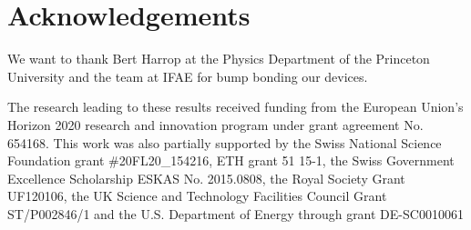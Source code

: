 \section*{Acknowledgements} 
We want to thank Bert Harrop at the Physics Department of the Princeton University and the team at IFAE for bump bonding our devices.\par
The research leading to these results received funding from the European Union's Horizon 2020 research and innovation program under grant agreement No. 654168. This work was also partially supported by the Swiss National Science Foundation grant \#20FL20\_154216, ETH grant 51 15-1, the  Swiss Government Excellence Scholarship ESKAS No. 2015.0808, the Royal Society Grant UF120106, the UK Science and Technology Facilities Council Grant ST/P002846/1 and the U.S. Department of Energy through grant DE-SC0010061
